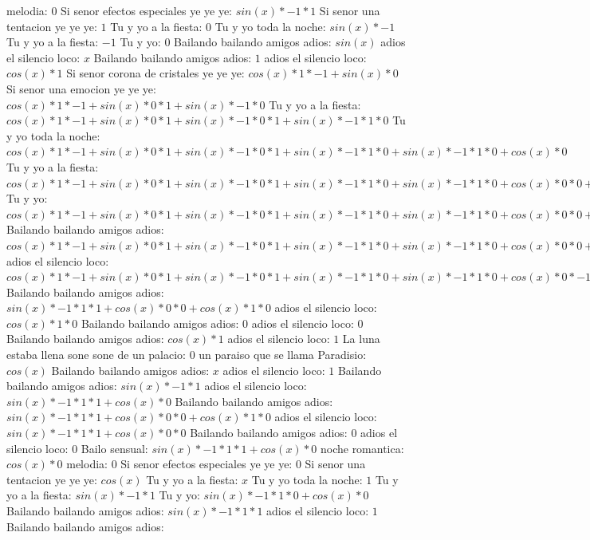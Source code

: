 \documentclass{article}
\begin{document}
melodia: $0$  \newline Si senor efectos especiales ye ye ye: $sin(x)*-1*1$ Si senor una tentacion ye ye ye: $1$ Tu y yo a la fiesta: $0$  \newline Tu y yo toda la noche: $sin(x)*-1$ Tu y yo a la fiesta: $-1$ Tu y yo: $0$  \newline Bailando bailando amigos adios: $sin(x)$  \newline adios el silencio loco: $x$ Bailando bailando amigos adios: $1$  \newline adios el silencio loco: $cos(x)*1$ Si senor corona de cristales ye ye ye: $cos(x)*1*-1+sin(x)*0$ Si senor una emocion ye ye ye: ${cos(x)*1*-1+sin(x)*0}*1+sin(x)*-1*0$ Tu y yo a la fiesta: ${{cos(x)*1*-1+sin(x)*0}*1+sin(x)*-1*0}*1+sin(x)*-1*1*0$ Tu y yo toda la noche: ${{cos(x)*1*-1+sin(x)*0}*1+sin(x)*-1*0}*1+sin(x)*-1*1*0+sin(x)*-1*1*0+cos(x)*0$ Tu y yo a la fiesta: ${{{cos(x)*1*-1+sin(x)*0}*1+sin(x)*-1*0}*1+sin(x)*-1*1*0+sin(x)*-1*1*0+cos(x)*0}*0+{sin(x)*-1*1*1+cos(x)*0}*0$ Tu y yo: ${{{cos(x)*1*-1+sin(x)*0}*1+sin(x)*-1*0}*1+sin(x)*-1*1*0+sin(x)*-1*1*0+cos(x)*0}*0+{sin(x)*-1*1*1+cos(x)*0}*0+{sin(x)*-1*1*1+cos(x)*0}*0+cos(x)*1*0$ Bailando bailando amigos adios: ${{{cos(x)*1*-1+sin(x)*0}*1+sin(x)*-1*0}*1+sin(x)*-1*1*0+sin(x)*-1*1*0+cos(x)*0}*0+{sin(x)*-1*1*1+cos(x)*0}*0+{sin(x)*-1*1*1+cos(x)*0}*0+cos(x)*1*0+{sin(x)*-1*1*1+cos(x)*0}*0+cos(x)*1*0+cos(x)*1*0+sin(x)*0$ adios el silencio loco: ${{{cos(x)*1*-1+sin(x)*0}*1+sin(x)*-1*0}*1+sin(x)*-1*1*0+sin(x)*-1*1*0+cos(x)*0}*-1+{sin(x)*-1*1*1+cos(x)*0}*0+{sin(x)*-1*1*1+cos(x)*0}*0+cos(x)*1*0$  \newline Bailando bailando amigos adios: ${sin(x)*-1*1*1+cos(x)*0}*0+cos(x)*1*0$  \newline adios el silencio loco: $cos(x)*1*0$ Bailando bailando amigos adios: $0$ adios el silencio loco: $0$  \newline Bailando bailando amigos adios: $cos(x)*1$ adios el silencio loco: $1$ La luna estaba llena sone sone de un palacio: $0$  \newline un paraiso que se llama Paradisio: $cos(x)$  \newline Bailando bailando amigos adios: $x$ adios el silencio loco: $1$  \newline Bailando bailando amigos adios: $sin(x)*-1*1$ adios el silencio loco: $sin(x)*-1*1*1+cos(x)*0$ Bailando bailando amigos adios: ${sin(x)*-1*1*1+cos(x)*0}*0+cos(x)*1*0$ adios el silencio loco: ${sin(x)*-1*1*1+cos(x)*0}*0$ Bailando bailando amigos adios: $0$ adios el silencio loco: $0$  \newline Bailo sensual: $sin(x)*-1*1*1+cos(x)*0$  \newline noche romantica: $cos(x)*0$ melodia: $0$ Si senor efectos especiales ye ye ye: $0$  \newline Si senor una tentacion ye ye ye: $cos(x)$  \newline Tu y yo a la fiesta: $x$ Tu y yo toda la noche: $1$  \newline Tu y yo a la fiesta: $sin(x)*-1*1$ Tu y yo: $sin(x)*-1*1*0+cos(x)*0$ Bailando bailando amigos adios: $sin(x)*-1*1*1$ adios el silencio loco: $1$ Bailando bailando amigos adios: 
\end{document}
